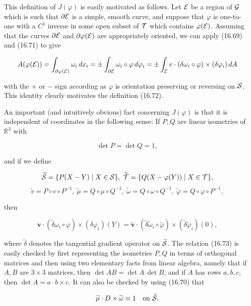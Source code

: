 This definition of $J(\varphi)$ is easily motivated as follows. Let $\mathcal{E}$ be a region of $\mathcal{G}$ which is
such that $\partial\mathcal{E}$ is a simple, smooth curve, and suppose that $\varphi$ is one-to-one with a $C^1$
inverse in some open subset of $\mathcal{T}$ which contains $\varphi(\mathcal{E})$. Assuming that the curves
$\partial\mathcal{E}$ and $\partial\varphi(\mathcal{E})$ are appropriately oriented, we can apply (16.69) and (16.71) to give

\[
A(\varphi(\mathcal{E}))=\int_{\partial\varphi(\mathcal{E})}\omega_i\,dx_i=\pm\int_{\partial\mathcal{E}}\omega_i\circ\varphi\,d\varphi_i=\pm\int_{\mathcal{E}} v\cdot (\delta\omega_i\circ\varphi)\times(\delta\varphi_i)\,dA
\]



with the $+$ or $-$ sign according as $\varphi$ is orientation preserving or reversing on $\mathcal{S}$.
This identity clearly motivates the definition (16.72).

An important (and intuitively obvious) fact concerning $J(\varphi)$ is that it is independent of coordinates in the following sense: If $P, Q$ are linear isometries of $\mathbb{R}^3$ with

\[
\det P=\det Q=1,
\]

and if we define

\[
\widetilde{\Sc}=\{P(X-Y)\mid X\in\Sc\},\ \widetilde{\Tc}=\{Q(X-\varphi(Y))\mid X\in\Tc\},
\]
\[
\widetilde{v}=P\circ v\circ P^{-1},\ \widetilde{\mu}=Q\circ \mu\circ Q^{-1},\ \widetilde{\omega}=Q\circ \omega\circ Q^{-1},\ \widetilde{\varphi}=Q\circ \varphi\circ P^{-1},
\]

then

\begin{equation}\tag{16.73}
\mathbf{v}\cdot(\widetilde{\delta}\omega_i\circ\varphi)\times(\delta\varphi_i)(Y)=\widetilde{\mathbf{v}}\cdot(\widetilde{\delta}\widetilde{\omega}_i\circ\widetilde{\varphi})\times(\widetilde{\delta}\widetilde{\varphi}_i)(0),
\end{equation}

where $\widetilde{\delta}$ denotes the tangential gradient operator on $\widetilde{\mathcal{S}}$. The relation (16.73) is
easily checked by first representing the isometries $P, Q$ in terms of orthogonal
matrices and then using two elementary facts from linear algebra, namely that if
$A, B$ are $3\times 3$ matrices, then $\det AB=\det A\,\det B$, and if $A$ has rows $a, b, c$, then
$\det A=a\cdot b\times c$. It can also be checked by using (16.70) that

\[
\widetilde{\mu}\cdot D\times \widetilde{\omega}\equiv 1\quad \text{on }\widetilde{\mathcal{S}}.
\]

